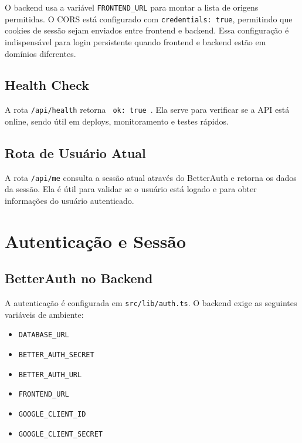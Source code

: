 \documentclass[
    12pt,
    oneside,
    openright,
    a4paper,
    english,
    brazil
]{abntex2}
\begin{document}
O backend usa a variável \texttt{FRONTEND\_URL} para montar a lista de origens permitidas. O CORS está configurado com \texttt{credentials: true}, permitindo que cookies de sessão sejam enviados entre frontend e backend. Essa configuração é indispensável para login persistente quando frontend e backend estão em domínios diferentes.

\section{Health Check}

A rota \texttt{/api/health} retorna \texttt{{ ok: true }}. Ela serve para verificar se a API está online, sendo útil em deploys, monitoramento e testes rápidos.

\section{Rota de Usuário Atual}

A rota \texttt{/api/me} consulta a sessão atual através do BetterAuth e retorna os dados da sessão. Ela é útil para validar se o usuário está logado e para obter informações do usuário autenticado.


\chapter{Autenticação e Sessão}

\section{BetterAuth no Backend}

A autenticação é configurada em \texttt{src/lib/auth.ts}. O backend exige as seguintes variáveis de ambiente:

\begin{itemize}
    \item \texttt{DATABASE\_URL}
    \item \texttt{BETTER\_AUTH\_SECRET}
    \item \texttt{BETTER\_AUTH\_URL}
    \item \texttt{FRONTEND\_URL}
    \item \texttt{GOOGLE\_CLIENT\_ID}
    \item \texttt{GOOGLE\_CLIENT\_SECRET}
\end{itemize}
\end{document}
